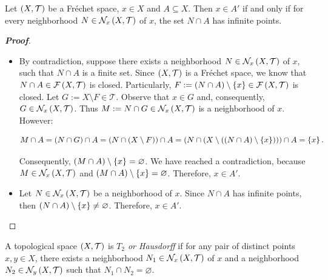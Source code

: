 \begin{proposition}
  Let $\left(X,\mathcal{T}\right)$ be a Fréchet space, $x\in X$ and $A\subseteq X$. Then $x\in A'$ if and only if for every neighborhood $N\in\mathcal{N}_x\left(X,\mathcal{T}\right)$ of $x$, the set $N\cap A$ has infinite points.
  
  \begin{proof}[\rm\textbf{Proof}]
    \hfill
    \begin{itemize}
      \item[\boxed{\Rightarrow}] By contradiction, suppose there exists a neighborhood $N\in\mathcal{N}_x\left(X,\mathcal{T}\right)$ of $x$, such that $N\cap A$ is a finite set. Since $\left(X,\mathcal{T}\right)$ is a Fréchet space, we know that $N\cap A\in\mathcal{F}\left(X,\mathcal{T}\right)$ is closed. Particularly, $F:=\left(N\cap A\right)\setminus\left\{x\right\}\in\mathcal{F}\left(X,\mathcal{T}\right)$ is closed. Let $G:=X\setminus F\in\mathcal{T}$. Observe that $x\in G$ and, consequently, $G\in\mathcal{N}_x\left(X,\mathcal{T}\right)$. Thus $M:=N\cap G\in\mathcal{N}_x\left(X,\mathcal{T}\right)$ is a neighborhood of $x$. However:
      
      \begin{equation}
        M\cap A=\left(N\cap G\right)\cap A=\left(N\cap\left(X\setminus F\right)\right)\cap A=\left(N\cap\left(X\setminus\left(\left(N\cap A\right)\setminus\left\{x\right\}\right)\right)\right)\cap A=\left\{x\right\}.
      \end{equation}
    
      Consequently, $\left(M\cap A\right)\setminus\left\{x\right\}=\varnothing$. We have reached a contradiction, because $M\in\mathcal{N}_x\left(X,\mathcal{T}\right)$ and $\left(M\cap A\right)\setminus\left\{x\right\}=\varnothing$. Therefore, $x\in A'$.
      \item[\boxed{\Leftarrow}] Let $N\in\mathcal{N}_x\left(X,\mathcal{T}\right)$ be a neighborhood of $x$. Since $N\cap A$ has infinite points, then $\left(N\cap A\right)\setminus\left\{x\right\}\neq\varnothing$. Therefore, $x\in A'$.
    \end{itemize}
  \end{proof}
\end{proposition}

\begin{definition}
  A topological space $\left(X,\mathcal{T}\right)$ is \textit{$T_2$ or Hausdorff} if for any pair of distinct points $x,y\in X$, there exists a neighborhood $N_1\in\mathcal{N}_x\left(X,\mathcal{T}\right)$ of $x$ and a neighborhood $N_2\in\mathcal{N}_y\left(X,\mathcal{T}\right)$ such that $N_1\cap N_2=\varnothing$.
\end{definition}


